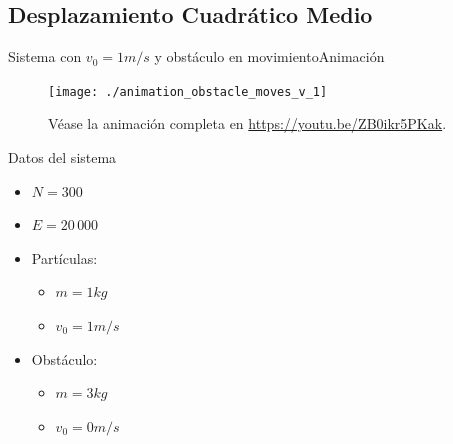 \documentclass{beamer}
\begin{document}
        \subsection{Desplazamiento Cuadrático Medio}

            \begin{frame}{Sistema con $v_0=1m/s$ y obstáculo en movimiento}{Animación}
                \begin{minipage}[t]{0.60\textwidth}
                    \begin{figure}[H!]
                        \texttt{[image: ./animation\_obstacle\_moves\_v\_1]}
                        \caption*{Véase la animación completa en \url{https://youtu.be/ZB0ikr5PKak}.}
                        \label{fig:a_5}
                    \end{figure}
                \end{minipage}
                \hfill
                \begin{minipage}[t]{0.30\textwidth}
                    \begin{block}{Datos del sistema}
                        \begin{itemize}
                            \item $N=300$
                            \item $E=20\,000$
                            \item Partículas:
                            \begin{itemize}
                                \item $m = 1 kg$
                                \item $v_0 = 1 m/s$
                            \end{itemize}
                            \item Obstáculo:
                            \begin{itemize}
                                \item $m = 3 kg$
                                \item $v_0 = 0 m/s$
                            \end{itemize}
                        \end{itemize}
                    \end{block}
                \end{minipage}
            \end{frame}
\end{document}
